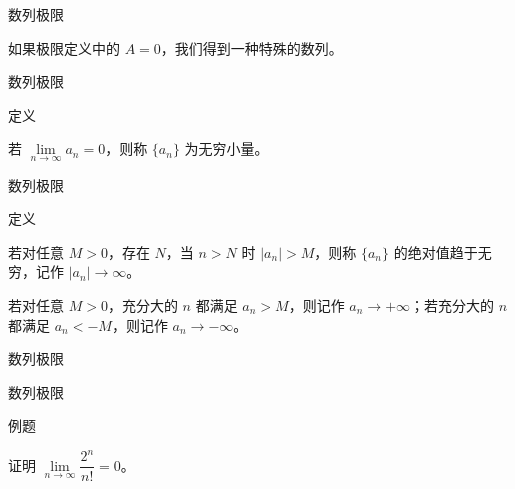 \documentclass[aspectratio=169,10pt,fontset=fandol]{ctexbeamer}
\begin{document}
\begin{frame}[t,fragile]{数列极限}
\normalsize
{\normalsize


如果极限定义中的 \(A = 0\)，我们得到一种特殊的数列。




}
\end{frame}
\begin{frame}[t,fragile]{数列极限}
\normalsize
\begin{block}{定义}
{\normalsize


	若 \(\lim\limits_{n\to\infty} a_n = 0\)，则称 \(\{a_n\}\) 为无穷小量。


}
\end{block}
\end{frame}
\begin{frame}[t,fragile]{数列极限}
\normalsize
\begin{block}{定义}
{\normalsize


	若对任意 \(M>0\)，存在 \(N\)，当 \(n>N\) 时 \(|a_n|>M\)，则称 \(\{a_n\}\) 的绝对值趋于无穷，记作 \(|a_n|\to\infty\)。

	若对任意 \(M>0\)，充分大的 \(n\) 都满足 \(a_n>M\)，则记作 \(a_n\to+\infty\)；若充分大的 \(n\) 都满足 \(a_n<-M\)，则记作 \(a_n\to-\infty\)。


}
\end{block}
\end{frame}
\begin{frame}[t,fragile]{数列极限}
\normalsize
{\normalsize


\iffalse


}
\end{frame}
\begin{frame}[t,fragile]{数列极限}
\normalsize
\begin{block}{例题}
{\normalsize
证明 \(\lim\limits_{n\to\infty} \dfrac{2^n}{n!} = 0\)。


}
\end{block}
\end{frame}
\end{document}
